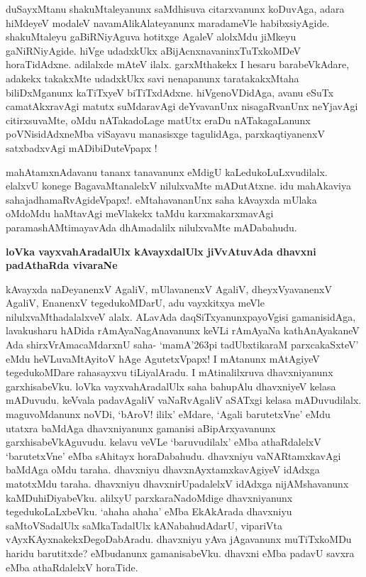 duSayxMtanu shakuMtaleyanunx saMdhisuva citarxvanunx koDuvAga, adara hiMdeyeV modaleV navamAlikAlateyanunx maradameVle habibxsiyAgide. shakuMtaleyu gaBiRNiyAguva hotitxge AgaleV alolxMdu jiMkeyu gaNiRNiyAgide. hiVge udadxkUkx aBijAcnxnavaninxTuTxkoMDeV horaTidAdxne. adilalxde mAteV ilalx. garxMthakekx I hesaru barabeVkAdare, adakekx takakxMte udadxkUkx savi nenapanunx taratakakxMtaha biliDxMganunx kaTiTxyeV biTiTxdAdxne. hiVgenoVDidAga, avanu eSuTx camatAkxravAgi matutx suMdaravAgi deYvavanUnx nisagaRvanUnx neYjavAgi citirxsuvaMte, oMdu nATakadoLage matUtx eraDu nATakagaLanunx poVNisidAdxneMba viSayavu manasisxge tagulidAga, parxkaqtiyanenxV satxbadxvAgi mADibiDuteVpapx !

mahAtamxnAdavanu tananx tanavanunx eMdigU kaLedukoLuLxvudilalx. elalxvU konege BagavaMtanalelxV nilulxvaMte mADutAtxne. idu mahAkaviya sahajadhamaRvAgideVpapx!. eMtahavananUnx saha kAvayxda mUlaka oMdoMdu haMtavAgi meVlakekx taMdu karxmakarxmavAgi paramashAMtimayavAda dhAmadalilx nilulxvaMte mADabahudu.

\noindent
{\bf\large{loVka vayxvahAradalUlx kAvayxdalUlx jiVvAtuvAda dhavxni padAthaRda vivaraNe}}\label{page235}

kAvayxda naDeyanenxV AgaliV, mUlavanenxV AgaliV, dheyxVyavanenxV AgaliV, EnanenxV tegedukoMDarU, adu vayxkitxya meVle nilulxvaMthadalalxveV alalx. ALavAda daqSiTxyanunxpayoVgisi gamanisidAga, lavakusharu hADida rAmAyaNagAnavanunx keVLi rAmAyaNa kathAnAyakaneV Ada shirxVrAmacaMdarxnU saha- `mamA\char'263pi tadUbxtikaraM\label{236} parxcakaSxteV' eMdu heVLuvaMtAyitoV hAge AgutetxVpapx! I mAtanunx mAtAgiyeV tegedukoMDare rahasayxvu tiLiyalAradu. I mAtinalilxruva dhavxniyanunx garxhisabeVku. loVka vayxvahAradalUlx saha bahupAlu dhavxniyeV kelasa mADuvudu. keVvala padavAgaliV vaNaRvAgaliV aSATxgi kelasa mADuvudilalx. maguvoMdanunx noVDi, `bAroV! ililx' eMdare, `Agali barutetxVne' eMdu utatxra baMdAga dhavxniyanunx gamanisi aBipArxyavanunx garxhisabeVkAguvudu. kelavu veVLe `baruvudilalx' eMba athaRdalelxV `barutetxVne' eMba sAhitayx horaDabahudu. dhavxniyu vaNARtamxkavAgi baMdAga oMdu taraha. dhavxniyu dhavxnAyxtamxkavAgiyeV idAdxga matotxMdu taraha. dhavxniyu dhavxnirUpadalelxV idAdxga nijAMshavanunx kaMDuhiDiyabeVku. alilxyU parxkaraNadoMdige dhavxniyanunx tegedukoLaLxbeVku. `ahaha ahaha' eMba EkAkArada dhavxniyu saMtoVSadalUlx saMkaTadalUlx kANabahudAdarU, vipariVta vAyxKAyxnakekxDegoDabAradu. dhavxniyu yAva jAgavanunx muTiTxkoMDu haridu barutitxde? eMbudanunx gamanisabeVku. dhavxni eMba padavU savxra eMba athaRdalelxV horaTide.

